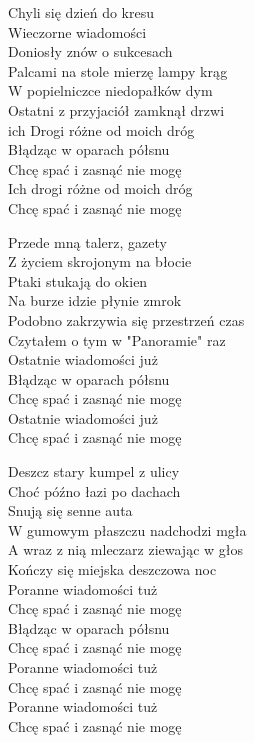 
\begin{text}
    Chyli się dzień do kresu\\
    Wieczorne wiadomości\\
    Doniosły znów o sukcesach\\
    Palcami na stole mierzę lampy krąg\\
    W popielniczce niedopałków dym\\
    Ostatni z przyjaciół zamknął drzwi\\
    ich Drogi różne od moich dróg\\
    Błądząc w oparach półsnu\\
    Chcę spać i zasnąć nie mogę\\
    Ich drogi różne od moich dróg\\
    Chcę spać i zasnąć nie mogę

    Przede mną talerz, gazety\\
    Z życiem skrojonym na błocie\\
    Ptaki stukają do okien\\
    Na burze idzie płynie zmrok\\
    Podobno zakrzywia się przestrzeń czas\\
    Czytałem o tym w "Panoramie" raz\\
    Ostatnie wiadomości już\\
    Błądząc w oparach półsnu\\
    Chcę spać i zasnąć nie mogę\\
    Ostatnie wiadomości już\\
    Chcę spać i zasnąć nie mogę

    Deszcz stary kumpel z ulicy\\
    Choć późno łazi po dachach\\
    Snują się senne auta\\
    W gumowym płaszczu nadchodzi mgła\\
    A wraz z nią mleczarz ziewając w głos\\
    Kończy się miejska deszczowa noc\\
    Poranne wiadomości tuż\\
    Chcę spać i zasnąć nie mogę\\
    Błądząc w oparach półsnu\\
    Chcę spać i zasnąć nie mogę\\
    Poranne wiadomości tuż\\
    Chcę spać i zasnąć nie mogę\\
    Poranne wiadomości tuż\\
    Chcę spać i zasnąć nie mogę
\end{text}
\begin{chord}

\end{chord}